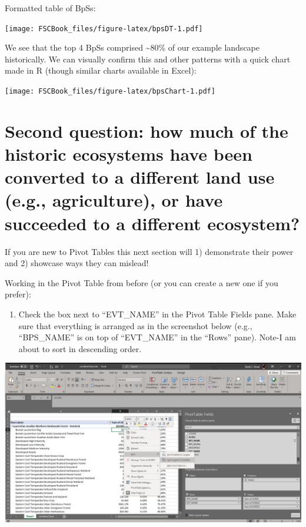 \documentclass[
]{book}
\providecommand{\tightlist}{%
  \setlength{\itemsep}{0pt}\setlength{\parskip}{0pt}}
\begin{document}
Formatted table of BpSs:

\texttt{[image: FSCBook\_files/figure-latex/bpsDT-1.pdf]}

We see that the top 4 BpSs comprised \textasciitilde80\% of our example landscape historically. We can visually confirm this and other patterns with a quick chart made in R (though similar charts available in Excel):

\texttt{[image: FSCBook\_files/figure-latex/bpsChart-1.pdf]}

\hypertarget{second-question-how-much-of-the-historic-ecosystems-have-been-converted-to-a-different-land-use-e.g.-agriculture-or-have-succeeded-to-a-different-ecosystem}{%
\section{Second question: how much of the historic ecosystems have been converted to a different land use (e.g., agriculture), or have succeeded to a different ecosystem?}\label{second-question-how-much-of-the-historic-ecosystems-have-been-converted-to-a-different-land-use-e.g.-agriculture-or-have-succeeded-to-a-different-ecosystem}}

If you are new to Pivot Tables this next section will 1) demonstrate their power and 2) showcase ways they can mislead!

Working in the Pivot Table from before (or you can create a new one if you prefer):

\begin{enumerate}
\def\labelenumi{\arabic{enumi}.}
\tightlist
\item
  Check the box next to ``EVT\_NAME'' in the Pivot Table Fields pane. Make sure that everything is arranged as in the screenshot below (e.g., ``BPS\_NAME'' is on top of ``EVT\_NAME'' in the ``Rows'' pane). Note-I am about to sort in descending order.
\end{enumerate}

\includegraphics[width=1\linewidth]{pivotBpsEvt}
\end{document}
